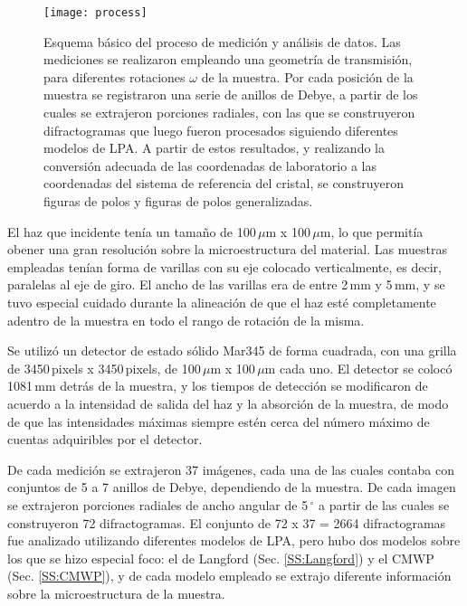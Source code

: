 \begin{figure}[!htb]
  \centering
  \texttt{[image: process]}
  \caption{Esquema básico del proceso de medición y análisis de datos. Las mediciones se realizaron empleando una geometría de transmisión, para diferentes rotaciones $\omega$ de la muestra. Por cada posición de la muestra se registraron una serie de anillos de Debye, a partir de los cuales se extrajeron porciones radiales, con las que se construyeron difractogramas que luego fueron procesados siguiendo diferentes modelos de LPA. A partir de estos resultados, y realizando la conversión adecuada de las coordenadas de laboratorio a las coordenadas del sistema de referencia del cristal, se construyeron figuras de polos y figuras de polos generalizadas.}
  \label{fig:transmision}
\end{figure}


El haz que incidente tenía un tamaño de 100\,$\mu$m x 100\,$\mu$m, lo que permitía obener una gran resolución sobre la microestructura del material.
Las muestras empleadas tenían forma de varillas con su eje colocado verticalmente, es decir, paralelas al eje de giro.
El ancho de las varillas era de entre 2\,mm y 5\,mm, y se tuvo especial cuidado durante la alineación de que el haz esté completamente adentro de la muestra en todo el rango de rotación de la misma.

Se utilizó un detector de estado sólido Mar345 de forma cuadrada, con una grilla de 3450\,pixels x 3450\,pixels, de 100\,$\mu$m x 100\,$\mu$m cada uno.
El detector se colocó 1081\,mm detrás de la muestra, y los tiempos de detección se modificaron de acuerdo a la intensidad de salida del haz y la absorción de la muestra, de modo de que las intensidades máximas siempre estén cerca del número máximo de cuentas adquiribles por el detector.

De cada medición se extrajeron 37 imágenes, cada una de las cuales contaba con conjuntos de 5 a 7 anillos de Debye, dependiendo de la muestra.
De cada imagen se extrajeron porciones radiales de ancho angular de 5\,$^{\circ}$ a partir de las cuales se construyeron 72 difractogramas.
El conjunto de 72 x 37 = 2664 difractogramas fue analizado utilizando diferentes modelos de LPA, pero hubo dos modelos sobre los que se hizo especial foco: el de Langford (Sec. \ref{SS:Langford}) y el CMWP (Sec. \ref{SS:CMWP}), y de cada modelo empleado se extrajo diferente información sobre la microestructura de la muestra.

